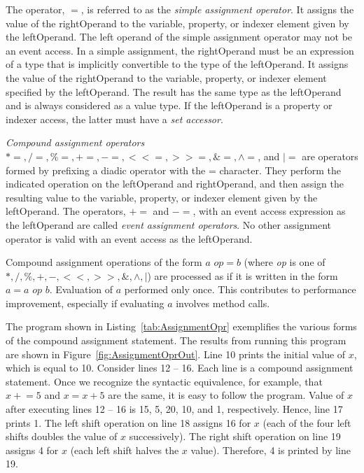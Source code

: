 \newpage

The operator, $=$, is referred to as  the \emph{simple assignment
operator}. It assigns the value of the rightOperand to the
variable, property, or indexer element given by the leftOperand.
The left operand of the simple assignment operator may not be an
event access. In a simple assignment, the rightOperand must be an
expression of a type that is implicitly convertible to the type of
the leftOperand. It assigns the value of the rightOperand to the
variable, property, or indexer element specified by the
leftOperand. The result has the same type as the leftOperand and
is always considered as a value type. If the leftOperand is a
property or indexer access, the latter must have a \emph{set
accessor}.



\emph{Compound assignment operators} $\ast \! =, /\!\!=, \%\!=,
+\!=, -\!=, <\!<=, >\!>=, \&\!=, \wedge\!\!=$,   and $\vert\!\!=$
are operators formed by prefixing a diadic operator with the =
character. They perform the indicated operation on the leftOperand
and rightOperand, and then assign the resulting value to the
variable, property, or indexer element given by the leftOperand.
The operators, $+ \! \!=$ and $- \! \!=$, with an event access
expression as the leftOperand are called \emph{event assignment
operators}. No other assignment operator is valid with an event
access as the leftOperand.


Compound assignment operations of the form $a \, \, op  =  b$
(where \emph{op} is one of $\ast, /, \%, +, -, < \! <, > \! >, \&,
\wedge, \vert$) are processed as if it is written in the form $ a
= a \, \, op \, \, b$. Evaluation of $a$ performed only once. This
contributes to performance improvement, especially if evaluating
$a$ involves method calls.


The program shown in Listing~\ref{tab:AssignmentOpr} exemplifies
the various forms of the compound assignment statement. The
results from running this program are shown in
Figure~\ref{fig:AssignmentOprOut}. Line 10 prints the initial
value of $x$, which is equal to 10. Consider lines 12 -- 16. Each
line is a compound assignment statement. Once we recognize the
syntactic equivalence, for example,  that $x +\!= 5$ and $x = x +
5$ are the same, it is easy to follow the program. Value of $x$
after executing lines 12 -- 16 is 15, 5, 20, 10, and 1,
respectively. Hence, line 17 prints 1. The left shift operation on
line 18 assigns 16 for $x$ (each of the four left shifts doubles
the value of $x$ successively). The right shift operation on line
19 assigns 4 for $x$ (each left shift halves the $x$ value).
Therefore, 4 is printed by line 19.




